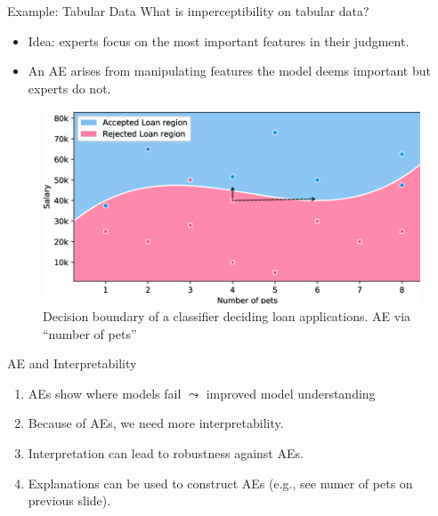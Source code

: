 \documentclass[11pt,compress,t,notes=noshow, aspectratio=169, xcolor=table]{beamer}
\begin{document}
\begin{vbframe}{Example: Tabular Data }
What is imperceptibility on tabular data?
\begin{itemize}
    \item Idea: experts focus on the most important features in their judgment.
    \item An AE arises from manipulating features the model deems important but experts do not.
\end{itemize}
\begin{figure}[h]
\centering
\includegraphics[width=0.6\linewidth]{figure/AEloanApplication.png}\\
   \centering
  {Decision boundary of a classifier deciding loan applications. AE via ``number of pets''}
  \label{fig:mnist}
\end{figure} 

\end{vbframe}

\begin{vbframe}[c]{AE and Interpretability}

\begin{enumerate}
    \item AEs show where models fail $\leadsto$ improved model understanding
    \item Because of AEs, we need more interpretability.
    \item Interpretation can lead to robustness against AEs.
    \medskip
    \item Explanations can be used to construct AEs (e.g., see numer of pets on previous slide).
\end{enumerate}

\end{vbframe}
\end{document}
